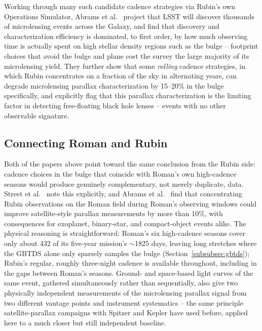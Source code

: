 \documentclass[english,10pt,a4paper]{article}
\begin{document}
	Working through many such candidate cadence strategies via Rubin's own Operations Simulator, Abrams et al.\ \cite{Abrams2025MicrolensingRubin} project that LSST will discover thousands of microlensing events across the Galaxy, and find that discovery and characterization efficiency is dominated, to first order, by how much observing time is actually spent on high stellar density regions such as the bulge -- footprint choices that avoid the bulge and plane cost the survey the large majority of its microlensing yield. They further show that some \textit{rolling} cadence strategies, in which Rubin concentrates on a fraction of the sky in alternating years, can degrade microlensing parallax characterization by 15--20\% in the bulge specifically, and explicitly flag that this parallax characterization is the limiting factor in detecting free-floating black hole lenses -- events with no other observable signature.
	
	\subsection{Connecting Roman and Rubin}
	\label{subsec:connecting}
	
	Both of the papers above point toward the same conclusion from the Rubin side: cadence choices in the bulge that coincide with Roman's own high-cadence seasons would produce genuinely complementary, not merely duplicate, data. Street et al.\ \cite{Street2023GalacticPlane} note this explicitly, and Abrams et al.\ \cite{Abrams2025MicrolensingRubin} find that concentrating Rubin observations on the Roman field during Roman's observing windows could improve satellite-style parallax measurements by more than 10\%, with consequences for exoplanet, binary-star, and compact-object events alike. The physical reasoning is straightforward: Roman's six high-cadence seasons cover only about 432 of its five-year mission's $\sim$1825 days, leaving long stretches where the GBTDS alone only sparsely samples the bulge (Section~\ref{subsubsec:gbtds}); Rubin's regular, roughly three-night cadence is available throughout, including in the gaps between Roman's seasons. Ground- and space-based light curves of the same event, gathered simultaneously rather than sequentially, also give two physically independent measurements of the microlensing parallax signal from two different vantage points and instrument systematics -- the same principle satellite-parallax campaigns with Spitzer and Kepler have used before, applied here to a much closer but still independent baseline.
	
\end{document}
